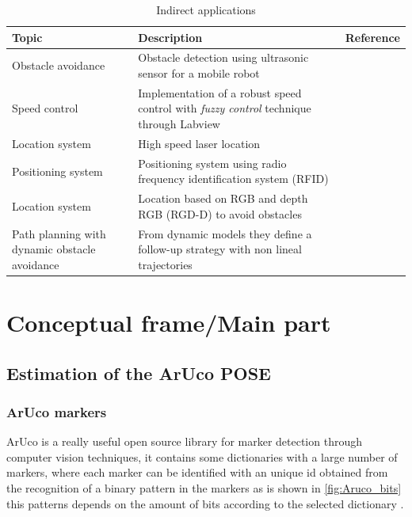 \begin{center}
\begin{table}[h!]
\caption{Indirect applications}\label{tab:related_work_indirect}
\centering{}%
\begin{tabular}{>{\raggedright}p{4cm}>{\raggedright}p{4cm}>{\raggedright}p{4cm}}
\hline 
\raggedright{}Topic & \raggedright{}Description & \raggedright{}Reference\tabularnewline
\hline 
\raggedright{}Obstacle avoidance  & \raggedright{}Obstacle detection using ultrasonic sensor for a mobile robot & \raggedright{}\citep{azeta2019obstacle}\tabularnewline
\hline 
\raggedright{}Speed control & \raggedright{}Implementation of a robust speed control with \textit{fuzzy control} technique
through Labview & \raggedright{}\citep{abril2012analisis}\tabularnewline
\hline 
\raggedright{}Location system & \raggedright{}High speed laser location & \raggedright{}\citep{tzou2009high}\tabularnewline
\hline 
\raggedright{}Positioning system & \raggedright{}Positioning system using radio frequency identification system (RFID)  & \raggedright{}\citep{qing2010research}\tabularnewline
\hline 
\raggedright{}Location system & \raggedright{}Location based on RGB and depth RGB (RGD-D) to avoid obstacles & \raggedright{}\citep{yuan2016rgb}\tabularnewline
\hline 
\raggedright{}Path planning with dynamic obstacle avoidance & \raggedright{}From dynamic models they define a follow-up strategy with non lineal trajectories  & \raggedright{}\citep{arcos2019optimal}\tabularnewline
\hline 
\end{tabular}
\end{table}
\par\end{center}





\cleardoublepage
\chapter{Conceptual frame/Main part}
\section{Estimation of the ArUco POSE}
\subsection{ArUco markers}
ArUco is a really useful open source library for marker detection through computer vision techniques, it contains some dictionaries with a large number of markers, where each marker can be identified with an unique id obtained from the recognition of a binary pattern in the markers as is shown in \autoref{fig:Aruco_bits} this patterns depends on the amount of bits according to the selected dictionary \citep{salinas2019aruco}.

